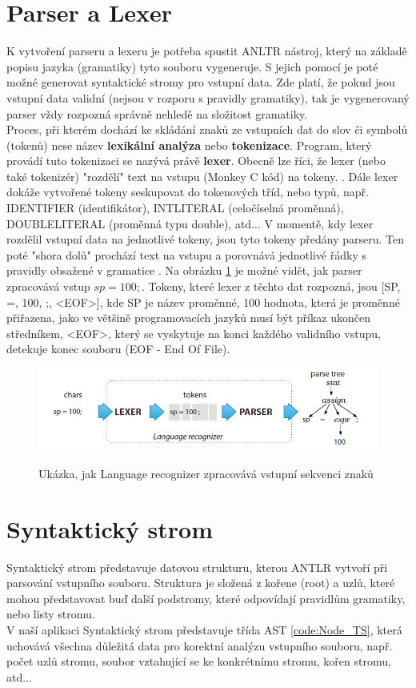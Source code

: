 \section{Parser a Lexer}
K vytvoření parseru a lexeru je potřeba spustit ANLTR nástroj, který na základě popisu jazyka (gramatiky) tyto souboru vygeneruje. S jejich pomocí je poté možné generovat syntaktické stromy pro vstupní data. Zde platí, že pokud jsou vstupní data validní (nejsou v rozporu s pravidly gramatiky), tak je vygenerovaný parser vždy rozpozná správně nehledě na složitost gramatiky.\\
Proces, při kterém dochází ke skládání znaků ze vstupních dat do slov či symbolů (tokenů) nese název \textbf{lexikální analýza} nebo \textbf{tokenizace}. Program, který provádí tuto tokenizaci se nazývá právě \textbf{lexer}. Obecně lze říci, že lexer (nebo také tokenizér) "rozdělí" text na vstupu (Monkey C kód) na tokeny. \cite{ANTLR_PG_20}. Dále lexer dokáže vytvořené tokeny seskupovat do tokenových tříd, nebo typů, např. IDENTIFIER (identifikátor), INTLITERAL (celočíselná proměnná), DOUBLELITERAL (proměnná typu double), atd...
V momentě, kdy lexer rozdělil vstupní data na jednotlivé tokeny, jsou tyto tokeny předány parseru. Ten poté "shora dolů" prochází text na vstupu a porovnává jednotlivé řádky s pravidly obsažené v gramatice \cite{ANTLR_PG_20}. Na obrázku \ref{img:parser} je možné vidět, jak parser zpracovává vstup $sp = 100;$. Tokeny, které lexer z těchto dat rozpozná, jsou [SP, =, 100, ;, <EOF>], kde SP je název proměnné, 100 hodnota, která je proměnné přiřazena, jako ve většině programovacích jazyků musí být příkaz ukončen středníkem, <EOF>, který se vyskytuje na konci každého validního vstupu, detekuje konec souboru (EOF - End Of File).


\begin{figure}[b!]
	\centering
	\includegraphics[scale=0.7]{images/parser}
	\caption{Ukázka, jak Language recognizer zpracovává vstupní sekvenci znaků} 			    \cite{ANTLR_PG_10}
	\label{img:parser}
\end{figure}

\section{Syntaktický strom}
Syntaktický strom představuje datovou strukturu, kterou ANTLR vytvoří při parsování vstupního souboru. Struktura je složená z kořene (root) a uzlů, které mohou představovat buď další podstromy, které odpovídají pravidlům gramatiky, nebo listy stromu.\\ 
V naší aplikaci Syntaktický strom představuje třída AST \ref{code:Node_TS}, která uchovává všechna důležitá data pro korektní analýzu vstupního souboru, např. počet uzlů stromu, soubor vztahující se ke konkrétnímu stromu, kořen stromu, atd...

